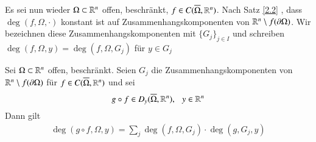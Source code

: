 Es sei nun wieder $\Omega \subset \mathbb{R}^n$ offen, beschränkt, $f\in C(\overline \Omega,\mathbb{R}^n)$. Nach Satz \ref{2.2}
, dass $\deg(f,\Omega,\cdot)$ konstant ist auf Zusammenhangskomponenten von $\mathbb{R}^n\setminus f(\partial 
\Omega)$. Wir bezeichnen diese Zusammenhangskomponenten mit $\{G_j\}_{j\in I}$ und schreiben $\deg(f,
\Omega,y)=\deg(f,\Omega,G_j)$ für $y\in G_j$

\begin{theorem}[Produktregel]\label{2.15}
    Sei $\Omega\subset\mathbb{R}^n$ offen, beschränkt. Seien $G_j$ die Zusammenhangskomponenten von $\mathbb{R}^n
    \setminus f(\partial \Omega)$ für $f\in C(\overline\Omega, \mathbb{R}^n)$ und sei
    \[
        g\circ f \in D_y(\overline \Omega,\mathbb{R}^n), \hspace{.25cm} y\in \mathbb{R}^n
    \]
    Dann gilt
    \begin{align}\label{9}
        \deg(g\circ f, \Omega, y)=\sum_j\deg(f,\Omega,G_j)\cdot \deg(g,G_j,y)
    \end{align}
\end{theorem}

